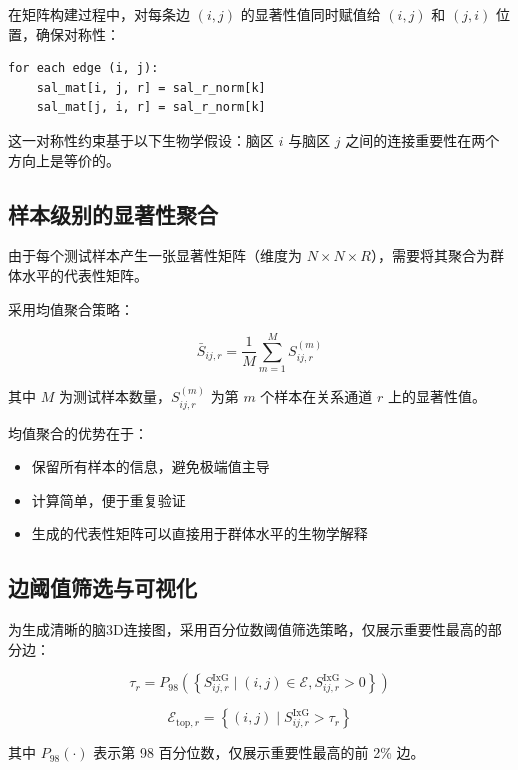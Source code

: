 在矩阵构建过程中，对每条边 $(i, j)$ 的显著性值同时赋值给 $(i, j)$ 和 $(j, i)$ 位置，确保对称性：

\begin{verbatim}
for each edge (i, j):
    sal_mat[i, j, r] = sal_r_norm[k]
    sal_mat[j, i, r] = sal_r_norm[k]
\end{verbatim}

这一对称性约束基于以下生物学假设：脑区 $i$ 与脑区 $j$ 之间的连接重要性在两个方向上是等价的。

\subsection{样本级别的显著性聚合}

由于每个测试样本产生一张显著性矩阵（维度为 $N \times N \times R$），需要将其聚合为群体水平的代表性矩阵。

采用均值聚合策略：

\begin{equation}
\bar{S}_{ij,r} = \frac{1}{M} \sum_{m=1}^{M} S_{ij,r}^{(m)}
\end{equation}

其中 $M$ 为测试样本数量，$S_{ij,r}^{(m)}$ 为第 $m$ 个样本在关系通道 $r$ 上的显著性值。

均值聚合的优势在于：
\begin{itemize}
    \item 保留所有样本的信息，避免极端值主导
    \item 计算简单，便于重复验证
    \item 生成的代表性矩阵可以直接用于群体水平的生物学解释
\end{itemize}

\subsection{边阈值筛选与可视化}

为生成清晰的脑3D连接图，采用百分位数阈值筛选策略，仅展示重要性最高的部分边：

\begin{equation}
\tau_r = P_{98}\left( \left\{ S_{ij,r}^{\text{IxG}} \mid (i,j) \in \mathcal{E}, S_{ij,r}^{\text{IxG}} > 0 \right\} \right)
\end{equation}

\begin{equation}
\mathcal{E}_{\text{top},r} = \left\{ (i,j) \mid S_{ij,r}^{\text{IxG}} > \tau_r \right\}
\end{equation}

其中 $P_{98}(\cdot)$ 表示第 98 百分位数，仅展示重要性最高的前 2\% 边。

